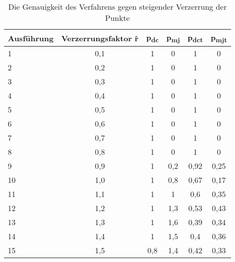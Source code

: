 \begin{table}[t]
	\centering
	\begin{tabular}[width=\textwidth]{l *{5}{c}}
		\hline
		\textbf{Ausführung} & \textbf{Verzerrungsfaktor \^{r}} & \textbf{p\textsubscript{dc}} & \textbf{p\textsubscript{mj}} & \textbf{p\textsubscript{dct}} & \textbf{p\textsubscript{mjt}} \\
		\hline
		1 & 0,1 & 1 & 0 & 1 & 0 \\
		2 & 0,2 & 1 & 0 & 1 & 0 \\
		3 & 0,3 & 1 & 0 & 1 & 0 \\
		4 & 0,4 & 1 & 0 & 1 & 0 \\
		5 & 0,5 & 1 & 0 & 1 & 0 \\
		6 & 0,6 & 1 & 0 & 1 & 0 \\
		7 & 0,7 & 1 & 0 & 1 & 0 \\
		8 & 0,8 & 1 & 0 & 1 & 0 \\
		9 & 0,9 & 1 & 0,2 & 0,92 & 0,25 \\
		10 & 1,0 & 1 & 0,8 & 0,67 & 0,17 \\
		11 & 1,1 & 1 & 1 & 0,6 & 0,35 \\
		12 & 1,2 & 1 & 1,3 & 0,53 & 0,43 \\
		13 & 1,3 & 1 & 1,6 & 0,39 & 0,34 \\
		14 & 1,4 & 1 & 1,5 & 0,4 & 0,36 \\
		15 & 1,5 & 0,8 & 1,4 & 0,42 & 0,33 \\
		\hline
	\end{tabular}
	\caption{Die Genauigkeit des Verfahrens gegen steigender Verzerrung der Punkte}
	\label{table: point_distortion_results}
\end{table}

